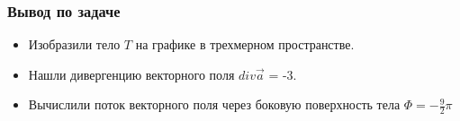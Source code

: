 \begin{frame}\frametitle{Вывод по задаче}
  \begin{itemize}
    \item Изобразили тело \(T\) на графике в трехмерном пространстве.

    \item Нашли дивергенцию векторного поля \(div \vec a\) = -3.

    \item Вычислили поток векторного поля через боковую поверхность тела \(\Phi = -\frac{9}{2}\pi \)
\end{itemize}

\end{frame}
